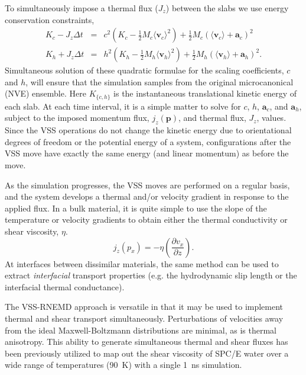 To simultaneously impose a thermal flux ($J_z$) between the slabs we
use energy conservation constraints,
\begin{eqnarray}
K_c - J_z\Delta t & = & c^2 (K_c - \frac{1}{2}M_c \langle\mathbf{v}_c
\rangle^2) + \frac{1}{2}M_c (\langle \mathbf{v}_c \rangle + \mathbf{a}_c)^2 \label{vss3}\\
K_h + J_z\Delta t & = & h^2 (K_h - \frac{1}{2}M_h \langle\mathbf{v}_h
\rangle^2) + \frac{1}{2}M_h (\langle \mathbf{v}_h \rangle +
\mathbf{a}_h)^2 \label{vss4}.
\label{constraint}
\end{eqnarray}
Simultaneous solution of these quadratic formulae for the scaling
coefficients, $c$ and $h$, will ensure that the simulation samples from
the original microcanonical (NVE) ensemble.  Here $K_{\{c,h\}}$ is the
instantaneous translational kinetic energy of each slab.  At each time
interval, it is a simple matter to solve for $c$, $h$, $\mathbf{a}_c$,
and $\mathbf{a}_h$, subject to the imposed momentum flux,
$j_z(\mathbf{p})$, and thermal flux, $J_z$, values.  Since the VSS
operations do not change the kinetic energy due to orientational
degrees of freedom or the potential energy of a system, configurations
after the VSS move have exactly the same energy (and linear
momentum) as before the move.

As the simulation progresses, the VSS moves are performed on a regular
basis, and the system develops a thermal and/or velocity gradient in
response to the applied flux.  In a bulk material, it is quite simple
to use the slope of the temperature or velocity gradients to obtain
either the thermal conductivity or shear viscosity,
$\eta$.\cite{Bordat2002a}
\begin{equation}
\label{eq:viscosity}
j_z(p_x) = -\eta \left(\frac{\partial v_x}{\partial z}\right).
\end{equation}
At interfaces between dissimilar materials, the same method can be
used to extract \textit{interfacial} transport properties (e.g. the
hydrodynamic slip length or the interfacial thermal
conductance).


The VSS-RNEMD approach is versatile in that it may be used to
implement thermal and shear transport simultaneously.  Perturbations
of velocities away from the ideal Maxwell-Boltzmann distributions are
minimal, as is thermal anisotropy.  This ability to generate
simultaneous thermal and shear fluxes has been previously utilized to
map out the shear viscosity of SPC/E water over a wide range of
temperatures (90~K) with a single 1~ns simulation.\cite{Kuang2012}


